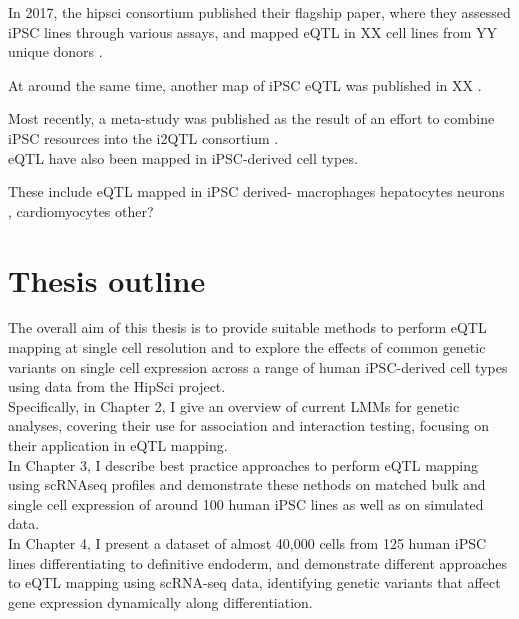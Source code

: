 In 2017, the \gls{hipsci} consortium published their flagship paper, where they assessed iPSC lines through various assays, and mapped eQTL in XX cell lines from YY unique donors
\cite{kilpinen2017common}.

At around the same time, another map of iPSC eQTL was published in XX \cite{deboever2017large}.

\cite{warren2017induced}

Most recently, a meta-study was published as the result of an effort to combine iPSC resources into the i2QTL consortium  
\cite{bonder2019systematic}.\\

eQTL have also been mapped in iPSC-derived cell types.

These include eQTL mapped in iPSC derived- 
macrophages \cite{alasoo2018shared}
hepatocytes \cite{pashos2017large}
neurons \cite{schwartzentruber2018molecular}, 
cardiomyocytes \cite{strober2019dynamic, banovich2018impact}
other?




\newpage

\section{Thesis outline}

The overall aim of this thesis is to provide suitable methods to perform eQTL mapping at single cell resolution and to explore the effects of common genetic variants on single cell expression across a range of human iPSC-derived cell types using data from the HipSci project.\\

Specifically, in Chapter 2, I give an overview of current LMMs for genetic analyses, covering their use for association and interaction testing, focusing on their application in eQTL mapping.\\

In Chapter 3, I describe best practice approaches to perform eQTL mapping using scRNAseq profiles and demonstrate these nethods on matched bulk and single cell expression of around 100 human iPSC lines as well as on simulated data.  \\

In Chapter 4, I present a dataset of almost 40,000 cells from 125 human iPSC lines differentiating to definitive endoderm, and demonstrate different approaches to eQTL mapping using scRNA-seq data, identifying genetic variants that affect gene expression dynamically along differentiation. \\

